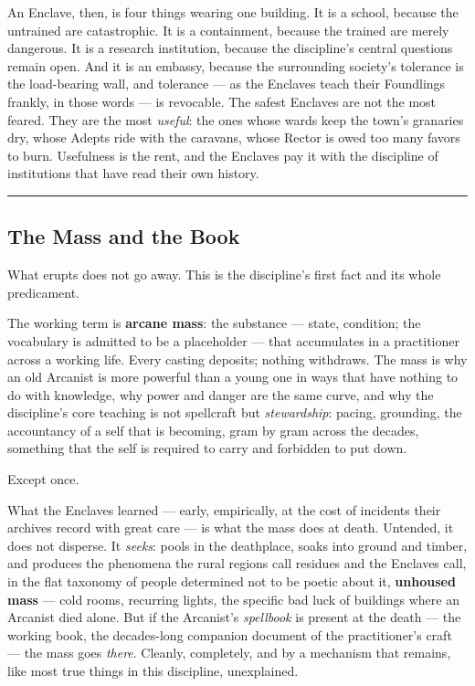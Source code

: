 An Enclave, then, is four things wearing one building. It is a school, because the untrained are catastrophic. It is a containment, because the trained are merely dangerous. It is a research institution, because the discipline's central questions remain open. And it is an embassy, because the surrounding society's tolerance is the load-bearing wall, and tolerance --- as the Enclaves teach their Foundlings frankly, in those words --- is revocable. The safest Enclaves are not the most feared. They are the most \textit{useful}: the ones whose wards keep the town's granaries dry, whose Adepts ride with the caravans, whose Rector is owed too many favors to burn. Usefulness is the rent, and the Enclaves pay it with the discipline of institutions that have read their own history.

\medskip\hrule\medskip

\subsection{The Mass and the Book}

What erupts does not go away. This is the discipline's first fact and its whole predicament.

The working term is \textbf{arcane mass}: the substance --- state, condition; the vocabulary is admitted to be a placeholder --- that accumulates in a practitioner across a working life. Every casting deposits; nothing withdraws. The mass is why an old Arcanist is more powerful than a young one in ways that have nothing to do with knowledge, why power and danger are the same curve, and why the discipline's core teaching is not spellcraft but \textit{stewardship}: pacing, grounding, the accountancy of a self that is becoming, gram by gram across the decades, something that the self is required to carry and forbidden to put down.

Except once.

What the Enclaves learned --- early, empirically, at the cost of incidents their archives record with great care --- is what the mass does at death. Untended, it does not disperse. It \textit{seeks}: pools in the deathplace, soaks into ground and timber, and produces the phenomena the rural regions call residues and the Enclaves call, in the flat taxonomy of people determined not to be poetic about it, \textbf{unhoused mass} --- cold rooms, recurring lights, the specific bad luck of buildings where an Arcanist died alone. But if the Arcanist's \textit{spellbook} is present at the death --- the working book, the decades-long companion document of the practitioner's craft --- the mass goes \textit{there}. Cleanly, completely, and by a mechanism that remains, like most true things in this discipline, unexplained.

